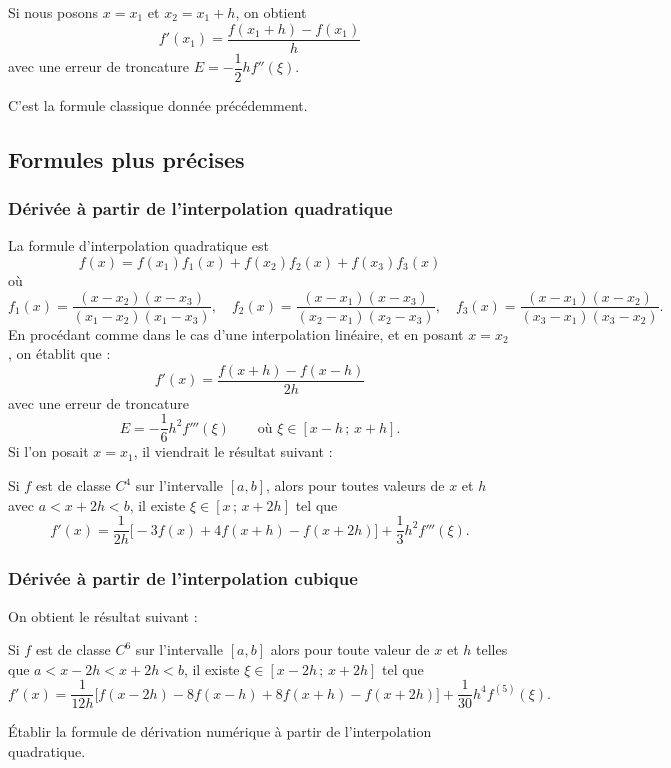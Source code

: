 Si nous posons $x = x_1$ et $x_2 = x_1 + h$, on obtient
\[
  f'(x_1) = \frac{f(x_1 + h) - f(x_1)}{h}
\]
avec une erreur de troncature $E = -\dfrac{1}{2}hf''(\xi)$.

C'est la formule classique donnée précédemment.

\subsection{Formules plus précises}

\subsubsection{Dérivée à partir de l'interpolation quadratique}

La formule d'interpolation quadratique est
\[
  f(x) = f(x_1)f_1(x) + f(x_2)f_2(x) + f(x_3)f_3(x)
\]
où
\[
  f_1(x) = \frac{(x - x_2)(x - x_3)}{(x_1 - x_2)(x_1 - x_3)}, \quad
  f_2(x) = \frac{(x - x_1)(x - x_3)}{(x_2 - x_1)(x_2 - x_3)}, \quad
  f_3(x) = \frac{(x - x_1)(x - x_2)}{(x_3 - x_1)(x_3 - x_2)} .
\]
En procédant comme dans le cas d'une interpolation linéaire, et en posant
$x = x_2$, on établit que :
\[
  f'(x) = \frac{f(x+h) - f(x-h)}{2h}
\]
avec une erreur de troncature
\[
  E = -\frac{1}{6}h^2f'''(\xi) \qquad\text{où } \xi \in [x - h\,;\,x + h] .
\]
Si l'on posait $x = x_1$, il viendrait le résultat suivant :

Si $f$ est de classe $C^4$ sur l'intervalle $[a,b]$, alors pour toutes valeurs
de $x$ et $h$ avec $a < x + 2h < b$, il existe $\xi \in [x\,;\,x + 2h]$ tel
que
\[
  f'(x) = \frac{1}{2h}\bigl[-3f(x) + 4f(x+h) - f(x+2h)\bigr] + \frac{1}{3}h^2f'''(\xi) .
\]

\subsubsection{Dérivée à partir de l'interpolation cubique}

On obtient le résultat suivant :

Si $f$ est de classe $C^6$ sur l'intervalle $[a,b]$ alors pour toute valeur de
$x$ et $h$ telles que $a < x - 2h < x + 2h < b$, il existe
$\xi \in [x - 2h\,;\,x + 2h]$ tel que
\[
  f'(x) = \frac{1}{12h}\bigl[f(x-2h) - 8f(x-h) + 8f(x+h) - f(x+2h)\bigr]
        + \frac{1}{30}h^4f^{(5)}(\xi) .
\]

\begin{exercice}[Exercice 1]
Établir la formule de dérivation numérique à partir de l'interpolation
quadratique.
\end{exercice}

